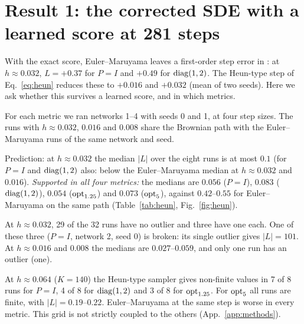 \section{Result 1: the corrected SDE with a learned score at 281 steps}
\label{sec:heun}

With the exact score, Euler--Maruyama leaves a first-order step error in \Sb{}: at $h\approx0.032$, $L=+0.37$ for $P=I$ and $+0.49$ for $\mathrm{diag}(1,2)$.
The Heun-type step of Eq.~\eqref{eq:heun} reduces these to $+0.016$ and $+0.032$ (mean of two seeds).
Here we ask whether this survives a learned score, and in which metrics.

For each metric we ran networks 1--4 with seeds 0 and 1, at four step sizes.
The runs with $h\approx0.032$, $0.016$ and $0.008$ share the Brownian path with the Euler--Maruyama runs of the same network and seed.

\begin{test}
\label{test:heun}
Prediction: at $h\approx0.032$ the median $|L|$ over the eight runs is at most $0.1$ (for $P=I$ and $\mathrm{diag}(1,2)$ also: below the Euler--Maruyama median at $h\approx0.032$ and $0.016$).
\emph{Supported in all four metrics:} the medians are $0.056$ ($P=I$), $0.083$ ($\mathrm{diag}(1,2)$), $0.054$ ($\mathrm{opt}_{1.25}$) and $0.073$ ($\mathrm{opt}_{5}$), against $0.42$--$0.55$ for Euler--Maruyama on the same path (Table~\ref{tab:heun}, Fig.~\ref{fig:heun}).
\end{test}



\begin{observation}
\label{obs:heun-outliers}
At $h\approx0.032$, 29 of the 32 runs have no outlier and three have one each.
One of these three ($P=I$, network 2, seed 0) is broken: its single outlier gives $|L|=101$.
At $h\approx0.016$ and $0.008$ the medians are $0.027$--$0.059$, and only one run has an outlier (one).
\end{observation}

\begin{observation}
\label{obs:heun-140}
At $h\approx0.064$ ($K=140$) the Heun-type sampler gives non-finite values in 7 of 8 runs for $P=I$, 4 of 8 for $\mathrm{diag}(1,2)$ and 3 of 8 for $\mathrm{opt}_{1.25}$.
For $\mathrm{opt}_{5}$ all runs are finite, with $|L|=0.19$--$0.22$.
Euler--Maruyama at the same step is worse in every metric.
This grid is not strictly coupled to the others (App.~\ref{app:methods}).
\end{observation}

